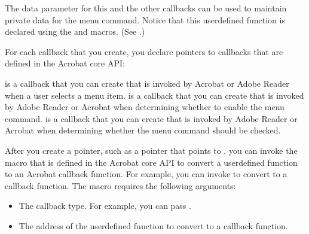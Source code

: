 \documentclass[letterpaper,12pt,english,openany,oneside]{sphinxmanual}
\begin{document}
\begin{sphinxVerbatim}[commandchars=\\\{\}]
     
      
\end{sphinxVerbatim}

The data parameter for this and the other callbacks can be used to maintain private data for the menu command. Notice that this user\sphinxhyphen{}defined function is declared using the  and  macros. (See .)

For each callback that you create, you declare pointers to callbacks that are defined in the Acrobat core API:

\begin{sphinxVerbatim}[commandchars=\\\{\}]
   
    
    
\end{sphinxVerbatim}

 is a callback that you can create that is invoked by Acrobat or Adobe Reader when a user selects a menu item.  is a callback that you can create that is invoked by Adobe Reader or Acrobat when determining whether to enable the menu command.  is a callback that you can create that is invoked by Adobe Reader or Acrobat when determining whether the menu command should be checked.

After you create a pointer, such as a pointer that points to , you can invoke the  macro that is defined in the Acrobat core API to convert a user\sphinxhyphen{}defined function to an Acrobat callback function. For example, you can invoke  to convert  to a callback function. The  macro requires the following arguments:
\begin{itemize}
\item {} 
The callback type. For example, you can pass .

\item {} 
The address of the user\sphinxhyphen{}defined function to convert to a callback function.

\end{itemize}
\end{document}
